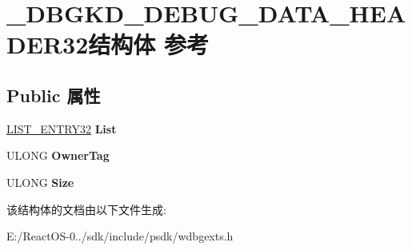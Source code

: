 \hypertarget{struct___d_b_g_k_d___d_e_b_u_g___d_a_t_a___h_e_a_d_e_r32}{}\section{\+\_\+\+D\+B\+G\+K\+D\+\_\+\+D\+E\+B\+U\+G\+\_\+\+D\+A\+T\+A\+\_\+\+H\+E\+A\+D\+E\+R32结构体 参考}
\label{struct___d_b_g_k_d___d_e_b_u_g___d_a_t_a___h_e_a_d_e_r32}
\subsection*{Public 属性}
\begin{DoxyCompactItemize}
\item 
\mbox{\label{struct___d_b_g_k_d___d_e_b_u_g___d_a_t_a___h_e_a_d_e_r32_ada3cb1e7b787be694db5f1918bfd90fe}} 
\hyperlink{struct_l_i_s_t___e_n_t_r_y32}{L\+I\+S\+T\+\_\+\+E\+N\+T\+R\+Y32} {\bfseries List}
\item 
\mbox{\label{struct___d_b_g_k_d___d_e_b_u_g___d_a_t_a___h_e_a_d_e_r32_af5f6be3eb86df51b7be421597deb9e0c}} 
U\+L\+O\+NG {\bfseries Owner\+Tag}
\item 
\mbox{\label{struct___d_b_g_k_d___d_e_b_u_g___d_a_t_a___h_e_a_d_e_r32_af264675d27fa36ff356506cd497b6cb9}} 
U\+L\+O\+NG {\bfseries Size}
\end{DoxyCompactItemize}


该结构体的文档由以下文件生成\+:\begin{DoxyCompactItemize}
\item 
E\+:/\+React\+O\+S-\/0../sdk/include/psdk/wdbgexts.\+h\end{DoxyCompactItemize}
